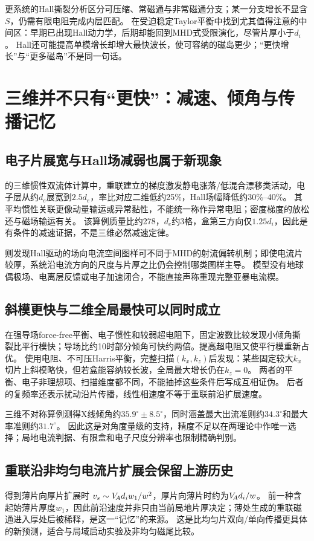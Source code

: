 更系统的Hall撕裂分析\citep{L250}区分可压缩、常磁通与非常磁通分支；某一分支增长不显含$S$，仍需有限电阻完成内层匹配。
\citet{L238}在受迫稳定Taylor平衡中找到尤其值得注意的中间区：早期已出现Hall动力学，后期却能回到MHD式受限演化，尽管片厚小于$d_i$。
Hall还可能提高单模增长却增大最快波长，使可容纳的磁岛更少；“更快增长”与“更多磁岛”不是同一句话。

\section{三维并不只有“更快”：减速、倾角与传播记忆}
\subsection{电子片展宽与Hall场减弱也属于新现象}
\citet{L020}的三维惯性双流体计算中，重联建立的梯度激发静电涨落/低混合漂移类活动，电子层从约$d_e$展宽到$2.5d_e$，率比对应二维低约25\%，Hall场幅降低约30\%--40\%。
其平均惯性关联更像动量输运或异常黏性，不能统一称作异常电阻；密度梯度的放松还与磁场输运有关。
该算例质量比约278，$d_e$约3格，盒第三方向仅$1.25d_i$，因此是有条件的减速证据，不是三维必然减速定律。

\citet{L204}则发现Hall驱动的场向电流空间图样可不同于MHD的射流偏转机制；即使电流片较厚，系统沿电流方向的尺度与片厚之比仍会控制哪类图样主导。
模型没有地球偶极场、电离层反馈或电子加速闭合，不能直接声称重现完整亚暴电流楔。

\subsection{斜模更快与二维全局最快可以同时成立}
\citet{L224}在强导场force-free平衡、电子惯性和较弱超电阻下，固定波数比较发现小倾角撕裂比平行模快；导场比约10时部分倾角可快约两倍。提高超电阻又使平行模重新占优。
\citet{L268}使用电阻、不可压Harris平衡，完整扫描$(k_x,k_z)$后发现：某些固定较大$k_x$切片上斜模略快，但若盒能容纳较长波，全局最大增长仍在$k_z=0$。
两者的平衡、电子非理想项、扫描维度都不同，不能抽掉这些条件后写成互相证伪。
后者的复频率还表示扰动沿片传播，线性相速度不等于重联前沿扩展速度。

\citet{L166}三维不对称算例测得X线倾角约$35.9^\circ\pm8.5^\circ$，同时涵盖最大出流准则约$34.3^\circ$和最大率准则约$31.7^\circ$。
因此这是对角度量级的支持，精度不足以在两理论中作唯一选择；局地电流判据、有限盒和电子尺度分辨率也限制精确判别。

\subsection{重联沿非均匀电流片扩展会保留上游历史}
\citet{L294}得到薄片向厚片扩展时
$v_s\sim V_{\!A} d_iw_1/w^2$，厚片向薄片时约为$V_{\!A} d_i/w$。
前一种含起始薄片厚度$w_1$，因此前沿速度并非只由当前局地片厚决定；薄处生成的重联磁通进入厚处后被稀释，是这一“记忆”的来源。
这是比均匀片双向/单向传播更具体的新预测，适合与局域启动实验及非均匀磁尾比较。

